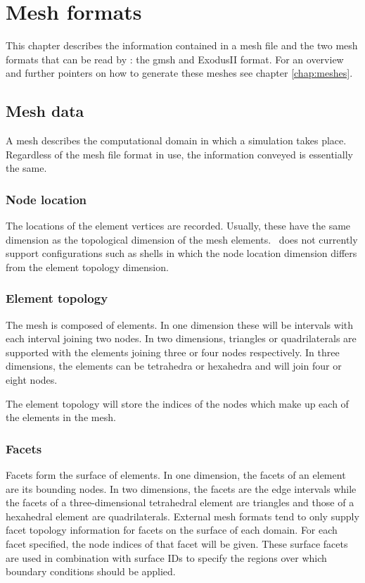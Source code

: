 \chapter{Mesh formats}\label{chap:mesh_formats}

This chapter describes the information contained in a mesh file and the
two mesh formats that can be read by \fluidity: the gmsh and
ExodusII format.
For an overview and further pointers on how to generate these meshes
see chapter \ref{chap:meshes}.

\section{Mesh data}

A mesh describes the computational domain in which a simulation takes
place. Regardless of the mesh file format in use, the information conveyed
is essentially the same.

\subsection{Node location}

The locations of the element vertices are recorded. Usually, these have the
same dimension as the topological dimension of the mesh elements. \fluidity\
does not currently support configurations such as shells in which the node
location dimension differs from the element topology dimension.

\subsection{Element topology}

The mesh is composed of elements. In one dimension these will be intervals
with each interval joining two nodes. In two dimensions, triangles or
quadrilaterals are supported with the elements joining three or four nodes
respectively. In three dimensions, the elements can be tetrahedra or
hexahedra and will join four or eight nodes.

The element topology will store the indices of the nodes which make up
each of the elements in the mesh.

\subsection{Facets}

Facets form the surface of elements. In one dimension, the facets of an
element are its bounding nodes. In two dimensions, the facets are the edge
intervals while the facets of a three-dimensional tetrahedral element are
triangles and those of a hexahedral element are quadrilaterals. External
mesh formats tend to only supply facet topology information for facets on
the surface of each domain. For each facet specified, the node indices of
that facet will be given. These surface facets are used in combination with
surface IDs to specify the regions over which boundary conditions should be
applied.

